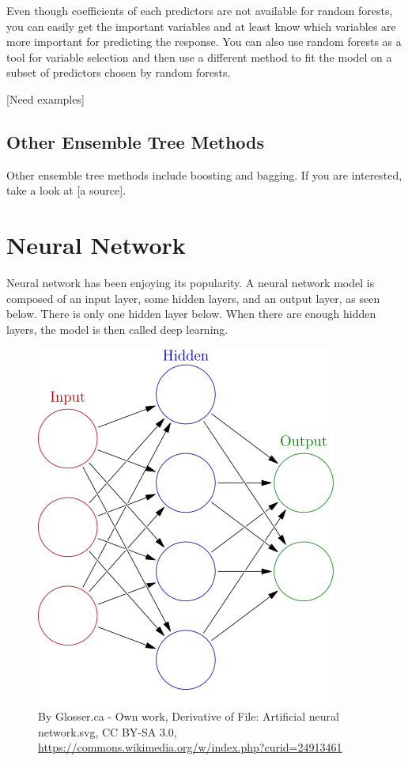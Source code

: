 \documentclass[
]{book}
\begin{document}
Even though coefficients of each predictors are not available for random forests, you can easily get the important variables and at least know which variables are more important for predicting the response. You can also use random forests as a tool for variable selection and then use a different method to fit the model on a subset of predictors chosen by random forests.

{[}Need examples{]}

\hypertarget{other-ensemble-tree-methods}{%
\subsection{Other Ensemble Tree Methods}\label{other-ensemble-tree-methods}}

Other ensemble tree methods include boosting and bagging. If you are interested, take a look at {[}a source{]}.

\hypertarget{neural-network}{%
\section{Neural Network}\label{neural-network}}

Neural network has been enjoying its popularity. A neural network model is composed of an input layer, some hidden layers, and an output layer, as seen below. There is only one hidden layer below. When there are enough hidden layers, the model is then called deep learning.

\begin{figure}
\centering
\includegraphics{images/Colored_neural_network.svg.png}
\caption{By Glosser.ca - Own work, Derivative of File: Artificial neural network.svg, CC BY-SA 3.0, \url{https://commons.wikimedia.org/w/index.php?curid=24913461}}
\end{figure}
\end{document}
